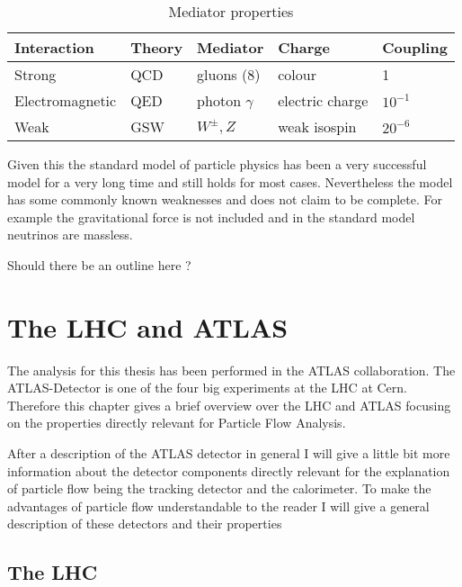 \begin{table}[]
\centering
\caption{Mediator properties}
\label{mediator properties}
\begin{tabular}{|l|l|l|l|l|}
\hline
Interaction     & Theory & Mediator        & Charge          & Coupling  \\ \hline
Strong          & QCD    & gluons (8)      & colour          & 1         \\ \hline
Electromagnetic & QED    & photon $\gamma$ & electric charge & $10^{-1}$ \\ \hline
Weak            & GSW    & $W^{\pm}, Z$    & weak isospin    & $20^{-6}$ \\ \hline
\end{tabular}
\end{table}

Given this the standard model of particle physics has been a very successful model for a very long time and still holds for most cases.
Nevertheless the model has some commonly known weaknesses and does not claim to be complete. For example the gravitational force is not included and in the standard model neutrinos are massless.

Should there be an outline here ? 
\newpage





\section{The LHC and ATLAS}

The analysis for this thesis has been performed in the ATLAS collaboration. The ATLAS-Detector is one of the four big experiments at the LHC at Cern. Therefore this chapter gives a brief overview over the LHC and ATLAS focusing on the properties directly relevant for Particle Flow Analysis.

After a description of the ATLAS detector in general I will give a little bit more information about the detector components directly relevant for the explanation of particle flow being the tracking detector and the calorimeter. To make the advantages of particle flow understandable to the reader I will give a general description of these detectors and their properties

\subsection{The LHC}

